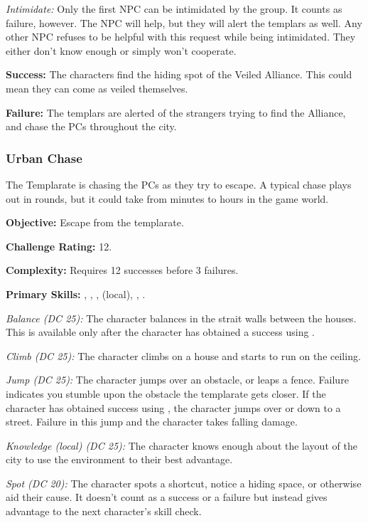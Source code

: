\textit{Intimidate:} Only the first NPC can be intimidated by the group. It counts as failure, however. The NPC will help, but they will alert the templars as well. Any other NPC refuses to be helpful with this request while being intimidated. They either don't know enough or simply won't cooperate.

\textbf{Success:} The characters find the hiding spot of the Veiled Alliance. This could mean they can come as veiled themselves.

\textbf{Failure:} The templars are alerted of the strangers trying to find the Alliance, and chase the PCs throughout the city.

\subsubsection{Urban Chase}
The Templarate is chasing the PCs as they try to escape. A typical chase plays out in rounds, but it could take from minutes to hours in the game world.

\textbf{Objective:} Escape from the templarate.

\textbf{Challenge Rating:} 12.

\textbf{Complexity:} Requires 12 successes before 3 failures.

\textbf{Primary Skills:} , , ,  (local), , .

\textit{Balance (DC 25):} The character balances in the strait walls between the houses. This is available only after the character has obtained a success using .

\textit{Climb (DC 25):} The character climbs on a house and starts to run on the ceiling.

\textit{Jump (DC 25):} The character jumps over an obstacle, or leaps a fence. Failure indicates you stumble upon the obstacle the templarate gets closer. If the character has obtained success using , the character jumps over or down to a street. Failure in this jump and the character takes falling damage.

\textit{Knowledge (local) (DC 25):} The character knows enough about the layout of the city to use the environment to their best advantage.

\textit{Spot (DC 20):} The character spots a shortcut, notice a hiding space, or otherwise aid their cause. It doesn't count as a success or a failure but instead gives advantage to the next character's skill check.

